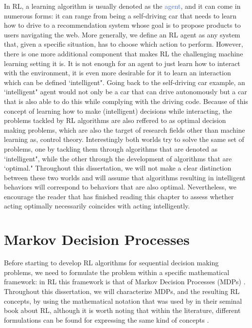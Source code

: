 In RL, a learning algorithm is usually denoted as the \textcolor{RoyalBlue}{agent}, and it can come in numerous forms: it can range from being a self-driving car that needs to learn how to drive to a recommendation system whose goal is to propose products to users navigating the web. More generally, we define an RL agent as any system that, given a specific situation, has to choose which action to perform. However, there is one more additional component that makes RL the challenging machine learning setting it is.
It is not enough for an agent to just learn how to interact with the environment, it is even more desirable for it to learn an interaction which can be defined `intelligent". Going back to the self-driving car example, an `intelligent" agent would not only be a car that can drive autonomously but a car that is also able to do this while complying with the driving code. Because of this concept of learning how to make (intelligent) decisions while interacting, the problems tackled by RL algorithms are also reffered to as optimal decision making problems, which are also the target of research fields other than machine learning as, control theory. Interestingly both worlds try to solve the same set of problems, one by tackling them through algorithms that are denoted as `intelligent", while the other through the development of algorithms that are `optimal." Throughout this dissertation, we will not make a clear distinction between these two worlds and will assume that algorithms resulting in intelligent behaviors will correspond to behaviors that are also optimal. Nevertheless, we encourage the reader that has finished reading this chapter to assess whether acting optimally necessarily coincides with acting intelligently.

\section{Markov Decision Processes}
\label{sec:mdps}

Before starting to develop RL algorithms for sequential decision making problems, we need to formulate the problem within a specific mathematical framework: in RL this framework is that of Markov Decision Processes (MDPs) \cite{puterman1990markov,puterman2014markov}. Throughout this dissertation, we will characterize MDPs, and the resulting RL concepts, by using the mathematical notation that was used by \citet{sutton2018reinforcement} in their seminal book about RL, although it is worth noting that within the literature, different formulations can be found for expressing the same kind of concepts \cite{bertsekas1995neuro,busoniu2010reinforcement,bertsekas2000dynamic,bertsekas2019reinforcement}.

